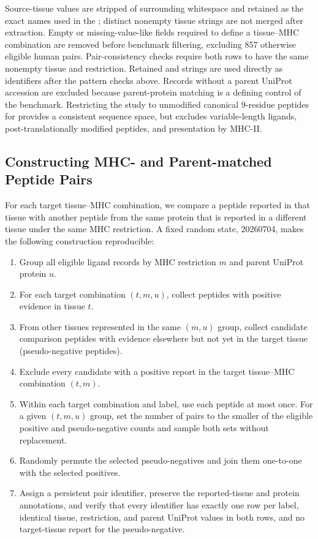 Source-tissue values are stripped of surrounding whitespace and retained as the exact names used in the \plainIEDB{}; distinct nonempty tissue strings are not merged after extraction. Empty or missing-value-like fields required to define a tissue--MHC combination are removed before benchmark filtering, excluding 857 otherwise eligible human pairs. Pair-consistency checks require both rows to have the same nonempty tissue and restriction. Retained \plainHLA{} and \plainHtwo{} strings are used directly as identifiers after the pattern checks above. Records without a parent UniProt accession are excluded because parent-protein matching is a defining control of the benchmark. Restricting the study to unmodified canonical 9-residue peptides for \plainMHCI{} provides a consistent sequence space, but excludes variable-length ligands, post-translationally modified peptides, and presentation by MHC-II.

\subsection{Constructing MHC- and Parent-matched Peptide Pairs}

For each target tissue--MHC combination, we compare a peptide reported in that tissue with another peptide from the same protein that is reported in a different tissue under the same MHC restriction. A fixed random state, 20260704, makes the following construction reproducible:

\begin{enumerate}
    \item Group all eligible ligand records by MHC restriction \(m\) and parent UniProt protein \(u\).
    \item For each target combination \((t,m,u)\), collect peptides with positive evidence in tissue \(t\).
    \item From other tissues represented in the same \((m,u)\) group, collect candidate comparison peptides with evidence elsewhere but not yet in the target tissue (pseudo-negative peptides).
    \item Exclude every candidate with a positive report in the target tissue--MHC combination \((t,m)\).
    \item Within each target combination and label, use each peptide at most once. For a given \((t,m,u)\) group, set the number of pairs to the smaller of the eligible positive and pseudo-negative counts and sample both sets without replacement.
    \item Randomly permute the selected pseudo-negatives and join them one-to-one with the selected positives.
    \item Assign a persistent pair identifier, preserve the reported-tissue and protein annotations, and verify that every identifier has exactly one row per label, identical tissue, restriction, and parent UniProt values in both rows, and no target-tissue report for the pseudo-negative.
\end{enumerate}


